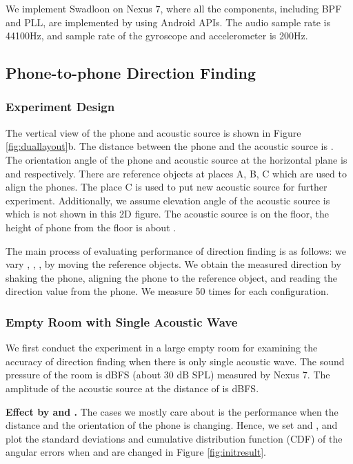 \documentclass[]{sig-alternate-10pt}
\def \ourprotocol{Swadloon\xspace}
\begin{document}
We implement \ourprotocol on Nexus 7, where all the components, including BPF and PLL, are implemented by using Android APIs.
The audio sample rate is  44100Hz, and sample rate of the gyroscope and
 accelerometer is 200Hz.


\subsection{Phone-to-phone Direction Finding}
\label{sec:p2pexp}
\subsubsection{Experiment Design}

The vertical view of the phone and acoustic source is shown in Figure
\ref{fig:duallayout}b. The distance between the phone and the acoustic
source is . The orientation angle of the phone and acoustic source
at the horizontal plane is  and  respectively. There
are reference objects at places A, B, C which are used to align
the phones. The place C is used to put new acoustic source for
further experiment. Additionally, we assume elevation angle of the
acoustic source is  which is not shown in this 2D figure. The
acoustic source is  on the floor, the height of phone from the
floor is about .

The main process of evaluating performance of direction finding is as
follows: we
vary , , ,  by moving the reference
objects. We obtain the measured direction  by shaking
the phone, aligning the phone to the reference object, and reading
the direction value from the phone. We measure  50 times
for each configuration.


\subsubsection{Empty Room with Single Acoustic Wave}

We first conduct the experiment in a large empty room  for
 examining the accuracy of direction finding
 when there is only single acoustic wave. The sound pressure of the room is  dBFS (about 30 dB SPL) measured by Nexus 7.  The amplitude of the acoustic source at the distance of  is  dBFS.

\noindent\textbf{Effect by  and .} The cases we mostly
care about is the performance when the distance  and the
orientation of the phone  is changing. Hence, we set
 and , and plot the standard deviations
and cumulative distribution function (CDF) of the angular errors when  and
 are changed in Figure \ref{fig:initresult}.
\end{document}
